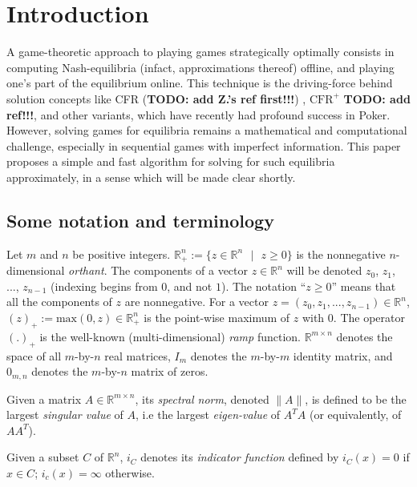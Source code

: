 \documentclass{article} %
\begin{document}
\section{Introduction}
\label{sec:intro}
A game-theoretic approach to playing games strategically optimally
consists in computing Nash-equilibria (infact, approximations thereof)
offline, and playing one's part of the equilibrium online. This
technique is the driving-force behind solution concepts like CFR
(\textbf{TODO: add Z.'s ref first!!!}) \cite{lanctot2009monte},
$\text{CFR}^{+}$ \textbf{TODO: add ref!!!}, and other variants, which
have recently had profound success in Poker. However, solving games
for equilibria remains a mathematical and computational challenge,
especially in sequential games with imperfect information. This paper
proposes a simple and fast algorithm for solving for such equilibria
approximately, in a sense which will be made clear shortly.


\subsection{Some notation and terminology}
Let $m$ and $n$ be positive integers.
$\mathbb{R}^{n}_+ := \{z \in \mathbb{R}^{n}\text{ }|\text{ } z \geq
0\}$ is the nonnegative $n$-dimensional \textit{orthant}.  The
components of a vector $z \in \mathbb{R}^n$ will be denoted $z_0$,
$z_1$, ..., $z_{n-1}$ (indexing begins from $0$, and not $1$). The
notation ``$z \ge 0$'' means that all the components of $z$ are
nonnegative. For a vector $z = (z_0, z_1, ..., z_{n-1}) \in
\mathbb{R}^n$, %
$(z)_+:=\text{max}(0, z) \in \mathbb{R}^{n}_+$ is the point-wise
maximum of $z$ with $0$.
The operator $(.)_+$ is the well-known
(multi-dimensional) \textit{ramp} function.
$\mathbb{R}^{m \times n}$ denotes the space of all $m$-by-$n$ real
matrices, $I_m$ denotes the $m$-by-$m$ identity matrix, and $0_{m,n}$
denotes the $m$-by-$n$ matrix of zeros.

Given a matrix $A \in \mathbb{R}^{m \times n}$, its \textit{spectral
  norm}, denoted $\|A\|$, is
 defined to be the largest \textit{singular value} of $A$, i.e the
 largest \textit{eigen-value} of $A^TA$ (or equivalently, of $AA^T$).

Given a subset $C$ of $\mathbb{R}^n$,
$i_C$ denotes its \textit{indicator function} defined by $i_C(x) = 0$
if $ x \in C$; $i_c(x) = \infty$ otherwise.
\end{document}
